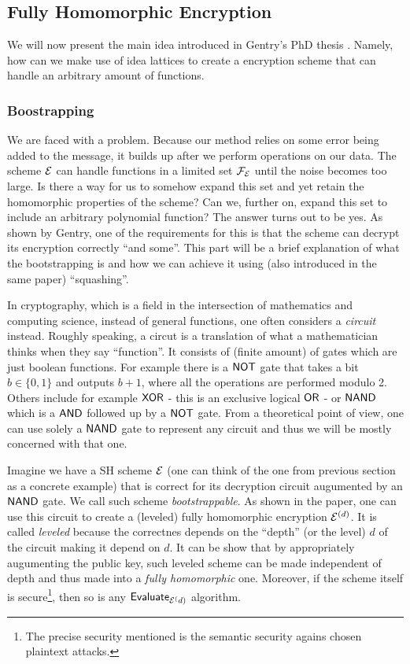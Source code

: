 \subsection{Fully Homomorphic Encryption}
We will now present the main idea introduced in Gentry's PhD thesis \cite{gentry_phd}. Namely, how can we make use of idea lattices to create a encryption scheme that can handle an arbitrary amount of functions.

\subsubsection{Boostrapping}
We are faced with a problem. Because our method relies on some error being added to the message, it builds up after we perform operations on our data. The scheme $\mathcal{E}$ can handle functions in a limited set $\mathcal{F}_{\mathcal{E}}$ until the noise becomes too large. Is there a way for us to somehow expand this set and yet retain the homomorphic properties of the scheme? Can we, further on, expand this set to include an arbitrary polynomial function? The answer turns out to be yes. As shown by Gentry, one of the requirements for this is that the scheme can decrypt its encryption correctly ``and some''. This part will be a brief explanation of what the bootstrapping is and how we can achieve it using (also introduced in the same paper) ``squashing''.

\begin{remark}
  In cryptography, which is a field in the intersection of mathematics and computing science, instead of general functions, one often considers a \textit{circuit} instead. Roughly speaking, a circut is a translation of what a mathematician thinks when they say ``function''. It consists of (finite amount) of gates which are just boolean functions. For example there is a $\alg{NOT}$ gate that takes a bit $b \in \{0,1\}$ and outputs $b + 1$, where all the operations are performed modulo 2. Others include for example $\alg{XOR}$ - this is an exclusive logical $\alg{OR}$ - or $\alg{NAND}$ which is a $\alg{AND}$ followed up by a $\alg{NOT}$ gate. From a theoretical point of view, one can use solely a $\alg{NAND}$ gate to represent any circuit and thus we will be mostly concerned with that one.
\end{remark}

Imagine we have a SH scheme $\mathcal{E}$ (one can think of the one from previous section as a concrete example) that is correct for its decryption circuit augumented by an $\alg{NAND}$ gate. We call such scheme \textit{bootstrappable}. As shown in the paper, one can use this circuit to create a (leveled) fully homomorphic encryption $\mathcal{E}^{(d)}$. It is called \textit{leveled} because the correctnes depends on the ``depth'' (or the level) $d$ of the circuit making it depend on $d$. It can be show that by appropriately augumenting the public key, such leveled scheme can be made independent of depth and thus made into a \textit{fully homomorphic} one. Moreover, if the scheme itself is secure\footnote{The precise security mentioned is the semantic security agains chosen plaintext attacks.}, then so is any $\alg{Evaluate}_{\E^(d)}$ algorithm.

